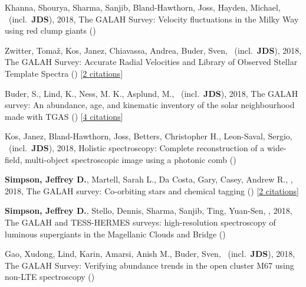 \item[{\color{numcolor}\scriptsize7}] Khanna, Shourya, Sharma, Sanjib, Bland-Hawthorn, Joss, Hayden, Michael, \etal\ (incl.\ \textbf{JDS}), 2018, The GALAH Survey: Velocity fluctuations in the Milky Way using red clump giants ()

\item[{\color{numcolor}\scriptsize6}] Zwitter, Toma{\v{z}}, Kos, Janez, Chiavassa, Andrea, Buder, Sven, \etal\ (incl.\ \textbf{JDS}), 2018, The GALAH Survey: Accurate Radial Velocities and Library of Observed Stellar Template Spectra () [\href{http://adsabs.harvard.edu/abs/2018arXiv180406344Z}{2 citations}]

\item[{\color{numcolor}\scriptsize5}] Buder, S., Lind, K., Ness, M. K., Asplund, M., \etal\ (incl.\ \textbf{JDS}), 2018, The GALAH survey: An abundance, age, and kinematic inventory of the solar neighbourhood made with TGAS () [\href{http://adsabs.harvard.edu/abs/2018arXiv180405869B}{4 citations}]

\item[{\color{numcolor}\scriptsize4}] Kos, Janez, Bland-Hawthorn, Joss, Betters, Christopher H., Leon-Saval, Sergio, \etal\ (incl.\ \textbf{JDS}), 2018, Holistic spectroscopy: Complete reconstruction of a wide-field, multi-object spectroscopic image using a photonic comb ()

\item[{\color{numcolor}\scriptsize3}] \textbf{Simpson, Jeffrey D.}, Martell, Sarah L., Da Costa, Gary, Casey, Andrew R., \etal, 2018, The GALAH survey: Co-orbiting stars and chemical tagging () [\href{http://adsabs.harvard.edu/abs/2018arXiv180405894S}{2 citations}]

\item[{\color{numcolor}\scriptsize2}] \textbf{Simpson, Jeffrey D.}, Stello, Dennis, Sharma, Sanjib, Ting, Yuan-Sen, \etal, 2018, The GALAH and TESS-HERMES surveys: high-resolution spectroscopy of luminous supergiants in the Magellanic Clouds and Bridge ()

\item[{\color{numcolor}\scriptsize1}] Gao, Xudong, Lind, Karin, Amarsi, Anish M., Buder, Sven, \etal\ (incl.\ \textbf{JDS}), 2018, The GALAH Survey: Verifying abundance trends in the open cluster M67 using non-LTE spectroscopy ()